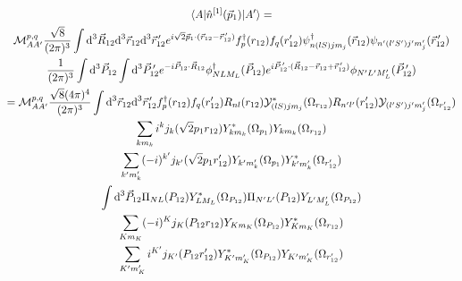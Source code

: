 \documentclass[10pt]{article}
\begin{document}
\begin{multline*}
	\braket{ A | \hat{n}^{[1]}(\vec{p}_1) | A'} = \\
  \mathcal{M}_{A A'}^{p,q} \frac{\sqrt{8}}{(2 \pi)^{3}} \int \text{d}^{3} \vec{R}_{12} \text{d}^{3} \vec{r}_{12} \text{d}^{3} \vec{r}_{12}^{\, \prime}  e^{ i \sqrt{2} \vec{p}_{1} \cdot ( \vec{r}_{12} - \vec{r}_{12}^{\, \prime}) }  f_{p}^{\dagger}(r_{12}) f_{q}(r_{12}') \psi_{ n (lS) j m_j}^{\dagger}(\vec{r}_{12}) \psi_{ n' (l'S') j' m_j'}(\vec{r}_{12}^{\, \prime})  \\
   \frac{1}{(2 \pi)^{3}} \int \text{d}^{3} \vec{P}_{12} \int \text{d}^{3} \vec{P}_{12}^{\, \prime} e^{ -i \vec{P}_{12} \cdot \vec{R}_{12}} \phi_{N L M_L}^{\dagger}(\vec{P}_{12}) e^{ i \vec{P}_{12}^{\, \prime} \cdot ( \vec{R}_{12} - \vec{r}_{12} + \vec{r}_{12}^{\, \prime})} \phi_{N' L' M_L'}(\vec{P}_{12}^{\, \prime}) \\
   = \mathcal{M}_{A A'}^{p,q} \frac{\sqrt{8} (4 \pi)^{4}}{(2 \pi)^{3}} \int \text{d}^{3} \vec{r}_{12} \text{d}^{3} \vec{r}_{12}^{\, \prime} f_{p}^{\dagger}(r_{12}) f_{q}(r_{12}')  R_{n l}(r_{12}) \mathcal{Y}_{(lS)jm_j}^{*}(\Omega_{r_{12}}) R_{n' l'}(r_{12}') \mathcal{Y}_{(l'S')j'm_j'}(\Omega_{r_{12}'}) \\
   \sum_{k m_k} i^{k} j_{k}( \sqrt{2} p_1 r_{12}) Y_{k m_k}^{*}(\Omega_{p_1}) Y_{k m_k}(\Omega_{r_{12}}) \\
   \sum_{k' m_k'} (-i)^{k'} j_{k'}( \sqrt{2} p_1 r_{12}') Y_{k' m_k'}(\Omega_{p_1}) Y_{k' m_k'}^{*}(\Omega_{r_{12}'}) \\
   \int \text{d}^{3} \vec{P}_{12} \Pi_{N L}(P_{12}) Y_{L M_L}^{*}(\Omega_{P_{12}}) \Pi_{N' L'}(P_{12}) Y_{L' M_L'}(\Omega_{P_{12}})   \\
   \sum_{K m_K} (-i)^{K} j_{K}(P_{12} r_{12}) Y_{K m_K}(\Omega_{P_{12}}) Y_{K m_K}^{*}(\Omega_{r_{12}}) \\
   \sum_{K' m_K'} i^{K'} j_{K'}(P_{12} r_{12}') Y_{K' m_K'}^{*}(\Omega_{P_{12}}) Y_{K' m_K'}(\Omega_{r_{12}'}) \\
\end{multline*}
\end{document}
